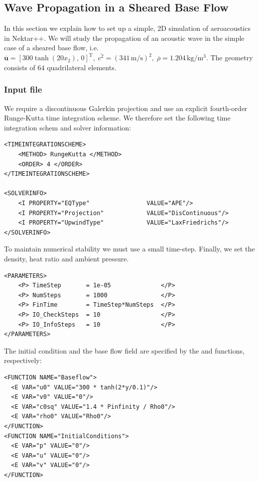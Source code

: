 \subsection{Wave Propagation in a Sheared Base Flow}
In this section we explain how to set up a simple, 2D simulation of aeroacoustics in
Nektar++. We will study the propagation of an acoustic wave in the simple case
of a sheared base flow, i.e. $\overline{\boldsymbol{u}} = \left[300  \tanh(20
x_2),\, 0\right]^{\mathrm{T}}, \; \overline{c^2}=\left(341\, \mathrm{m}/\mathrm{s}\right)^2, \; \overline{\rho} = 1.204\, \mathrm{kg}/\mathrm{m}^3$. The geometry consists
of $64$ quadrilateral elements.

\subsubsection{Input file}
We require a discontinuous Galerkin projection and use an explicit
fourth-order Runge-Kutta time integration scheme. We therefore set the
following time integration schem and solver information:
\begin{lstlisting}[style=XmlStyle]
<TIMEINTEGRATIONSCHEME>
    <METHOD> RungeKutta </METHOD>
    <ORDER> 4 </ORDER>
</TIMEINTEGRATIONSCHEME>

<SOLVERINFO>
    <I PROPERTY="EQType"                VALUE="APE"/>
    <I PROPERTY="Projection"            VALUE="DisContinuous"/>
    <I PROPERTY="UpwindType"            VALUE="LaxFriedrichs"/>
</SOLVERINFO>
\end{lstlisting}

To maintain numerical stability we must use a small time-step.
Finally, we set the density, heat ratio and ambient pressure.
\begin{lstlisting}[style=XMLStyle]
<PARAMETERS>
    <P> TimeStep       = 1e-05              </P>
    <P> NumSteps       = 1000               </P>
    <P> FinTime        = TimeStep*NumSteps  </P>
    <P> IO_CheckSteps  = 10                 </P>
    <P> IO_InfoSteps   = 10                 </P>
</PARAMETERS>
\end{lstlisting}

The initial condition and the base flow field are specified by the   and   functions, respectively:
\begin{lstlisting}[style=XMLStyle]
<FUNCTION NAME="Baseflow">
  <E VAR="u0" VALUE="300 * tanh(2*y/0.1)"/>
  <E VAR="v0" VALUE="0"/>
  <E VAR="c0sq" VALUE="1.4 * Pinfinity / Rho0"/>
  <E VAR="rho0" VALUE="Rho0"/>
</FUNCTION>
<FUNCTION NAME="InitialConditions">
  <E VAR="p" VALUE="0"/>
  <E VAR="u" VALUE="0"/>
  <E VAR="v" VALUE="0"/>
</FUNCTION>
\end{lstlisting}

